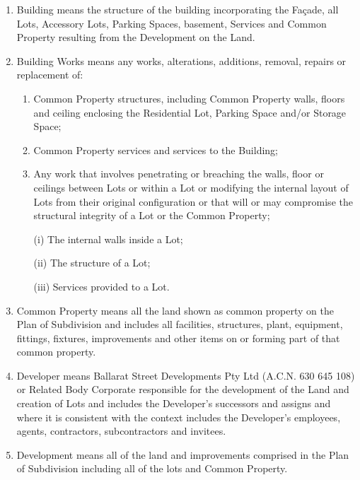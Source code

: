 \documentclass{article}
\begin{document}
\begin{enumerate}[label=\arabic*.]
\begin{enumerate}[label=\arabic{enumi}.\arabic*.]
\begin{enumerate}[label=(\arabic*)]
\item  Building means the structure of the building incorporating the Façade, all Lots, Accessory Lots, Parking Spaces, basement, Services and Common Property resulting from the Development on the Land.

\item  Building Works means any works, alterations, additions, removal, repairs or replacement of:

\begin{enumerate}[label=(\alph*)]

\item  Common Property structures, including Common Property walls, floors and ceiling enclosing the Residential Lot, Parking Space and/or Storage Space;

\item  Common Property services and services to the Building;

\item  Any work that involves penetrating or breaching the walls, floor or ceilings between Lots or within a Lot or modifying the internal layout of Lots from their original configuration or that will or may compromise the structural integrity of a Lot or the Common Property;

(i) The internal walls inside a Lot;
\newpage



(ii) The structure of a Lot;

(iii) Services provided to a Lot.

\end{enumerate}

\item  Common Property means all the land shown as common property on the Plan of Subdivision and includes all facilities, structures, plant, equipment, fittings, fixtures, improvements and other items on or forming part of that common property.

\item  Developer means Ballarat Street Developments Pty Ltd (A.C.N. 630 645 108) or Related Body Corporate responsible for the development of the Land and creation of Lots and includes the Developer’s successors and assigns and where it is consistent with the context includes the Developer’s employees, agents, contractors, subcontractors and invitees.

\item  Development means all of the land and improvements comprised in the Plan of Subdivision including all of the lots and Common Property.


\end{enumerate}
\end{enumerate}
\end{enumerate}
\end{document}
